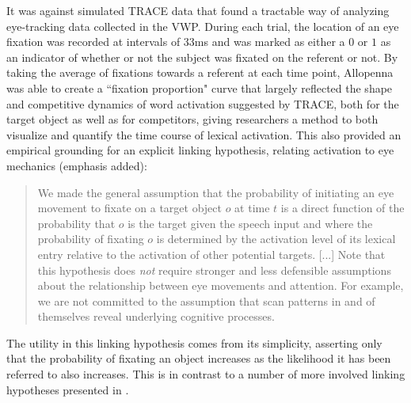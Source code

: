 \documentclass{article}
\begin{document}
It was against simulated TRACE data that \citet{allopenna1998tracking} found a tractable way of analyzing eye-tracking data collected in the VWP.  During each trial, the location of an eye fixation was recorded at intervals of 33ms and was marked as either a $0$ or $1$ as an indicator of whether or not the subject was fixated on the referent or not. By taking the average of fixations towards a referent at each time point, Allopenna was able to create a ``fixation proportion" curve that largely reflected the shape and competitive dynamics of word activation suggested by TRACE, both for the target object as well as for competitors, giving researchers a method to both visualize and quantify the time course of lexical activation. This also provided an empirical grounding for an explicit linking hypothesis, relating activation to eye mechanics  (emphasis added):

\begin{quote}
We made the general assumption that the probability of initiating an eye movement to fixate on a target object $o$ at time $t$ is a direct function of the probability that $o$ is the target given the speech input and where the probability of fixating $o$ is determined by the activation level of its lexical entry relative to the activation of other potential targets. [...] Note that this hypothesis does \emph{not} require stronger and less defensible assumptions about the relationship between eye  movements and attention. For example, we are not committed to the assumption that scan patterns in and of themselves reveal underlying cognitive processes. \citep{allopenna1998tracking}
\end{quote}

The utility in this linking hypothesis comes from its simplicity, asserting only that the probability of fixating an object increases as the likelihood it has been referred to also increases. This is in contrast to a number of more involved linking hypotheses presented in \citet{Magnuson2019}.
\end{document}
